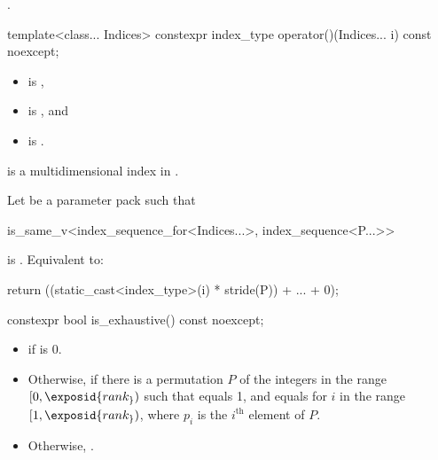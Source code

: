 \begin{itemdescr}
\pnum
\returns
{}.
\end{itemdescr}

%
\begin{itemdecl}
template<class... Indices>
  constexpr index_type operator()(Indices... i) const noexcept;
\end{itemdecl}

\begin{itemdescr}
\pnum
\constraints
\begin{itemize}
\item
{} is ,
\item
{} is , and
\item
{} is .
\end{itemize}

\pnum
\expects
{} is
a multidimensional index in .

\pnum
\effects
Let  be a parameter pack such that
\begin{codeblock}
is_same_v<index_sequence_for<Indices...>, index_sequence<P...>>
\end{codeblock}
is .
Equivalent to:
\begin{codeblock}
return ((static_cast<index_type>(i) * stride(P)) + ... + 0);
\end{codeblock}
\end{itemdescr}

%
\begin{itemdecl}
constexpr bool is_exhaustive() const noexcept;
\end{itemdecl}

\begin{itemdescr}
\pnum
\returns
\begin{itemize}
\item
{} if  is 0.
\item
Otherwise,  if there is
a permutation $P$ of the integers in the range $[0, \exposid{rank_})$
such that  equals 1, and
 equals 
for $i$ in the range $[1, \exposid{rank_})$,
where $p_i$ is the $i^\text{th}$ element of $P$.
\item
Otherwise, .
\end{itemize}
\end{itemdescr}

